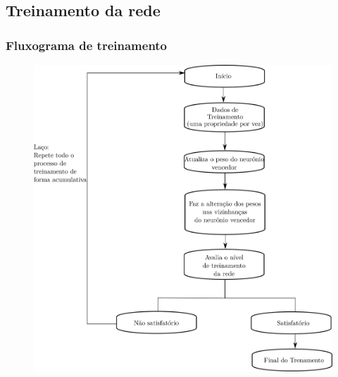 \documentclass[10pt]{beamer} %
\begin{document}
\subsection{Treinamento da rede}
\begin{frame}
	\frametitle{Fluxograma de treinamento}
	\begin{scriptsize}
		

	\begin{figure}[H]
		\centering
	
			\includegraphics[scale=0.35]{Imagens/treinamento.png}
	\end{figure}
\end{scriptsize}
\end{frame}
\end{document}
